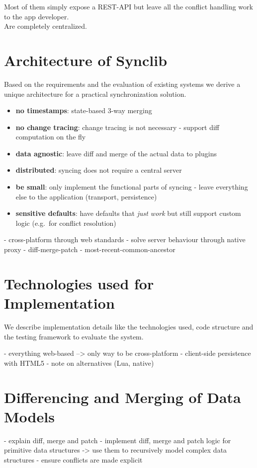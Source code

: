Most of them simply expose a REST-API but leave all the conflict handling work to the app developer.\\
Are completely centralized.

\section{Architecture of Synclib}
Based on the requirements and the evaluation of existing systems we derive a unique architecture for a practical synchronization solution.

\begin{itemize}
\item
  \textbf{no timestamps}: state-based 3-way merging
\item
  \textbf{no change tracing}: change tracing is not necessary - support
  diff computation on the fly
\item
  \textbf{data agnostic}: leave diff and merge of the actual data to
  plugins
\item
  \textbf{distributed}: syncing does not require a central server
\item
  \textbf{be small}: only implement the functional parts of syncing -
  leave everything else to the application (transport, persistence)
\item
  \textbf{sensitive defaults}: have defaults that \emph{just work} but
  still support custom logic (e.g.~for conflict resolution)
\end{itemize}

- cross-platform through web standards
- solve server behaviour through native proxy
- diff-merge-patch
- most-recent-common-ancestor

\section{Technologies used for Implementation}
We describe implementation details like the technologies used, code structure and the testing framework to evaluate the system.

- everything web-based --> only way to be cross-platform
- client-side persistence with HTML5
- note on alternatives (Lua, native)

\section{Differencing and Merging of Data Models}
- explain diff, merge and patch
- implement diff, merge and patch logic for primitive data structures
  -> use them to recursively model complex data structures
- ensure conflicts are made explicit

